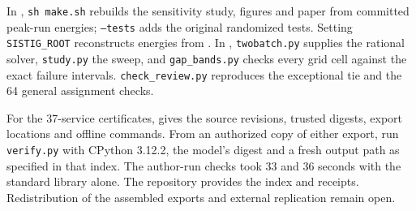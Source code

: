 In , \texttt{sh make.sh} rebuilds the sensitivity study,
figures and paper from committed peak-run energies; \texttt{--tests} adds
the original randomized tests. Setting \texttt{SISTIG\_ROOT} reconstructs
energies from \citet{sistig2025dataset}. In ,
\texttt{twobatch.py} supplies the rational solver, \texttt{study.py} the sweep,
and \texttt{gap\_bands.py} checks every grid cell against the exact failure
intervals. \texttt{check\_review.py} reproduces the exceptional tie and
the 64 general assignment checks.

\begingroup\sloppy
For the 37-service certificates,
 gives the source
revisions, trusted digests, export locations and offline commands.
From an authorized copy of either export, run \texttt{verify.py} with
CPython 3.12.2, the model's digest and a fresh output path as specified in
that index. The author-run checks took 33 and 36 seconds with the standard
library alone. The repository provides the index and receipts.
Redistribution of the assembled exports and external replication remain open.
\par\endgroup
